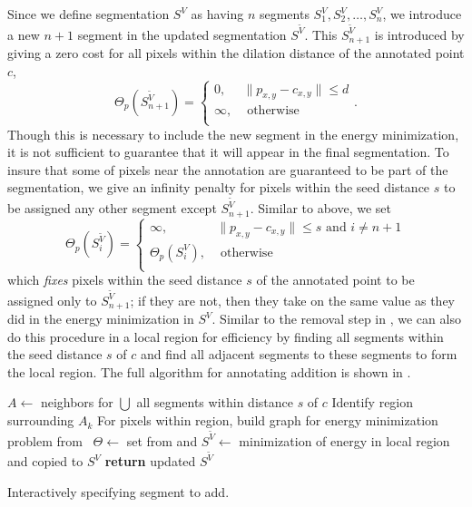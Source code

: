 \documentclass[]{spie}  %
\begin{document}
Since we define segmentation $S^V$ as having $n$ segments $S^V_1,
S^V_2, \ldots, S^V_n$, we introduce a new $n+1$ segment in the updated
segmentation $S^{\tilde{V}}$.  This $S^{\tilde{V}}_{n+1}$ is
introduced by giving a zero cost for all pixels within the dilation
distance of the annotated point $c$, \ie
\begin{equation}
  \label{eq:d}
  \Theta_p(S^{\tilde{V}}_{n+1}) = \left\{
    \begin{array}{lcr}
      0, & \| p_{x,y} - c_{x,y} \| \leq d  \\
      \infty, & \textrm{ otherwise} \\
    \end{array}
  \right. .
\end{equation}
Though this is necessary to include the new segment in the energy
minimization, it is not sufficient to guarantee that it will appear in
the final segmentation.  To insure that some of pixels near the
annotation are guaranteed to be part of the segmentation, we give an
infinity penalty for pixels within the seed distance $s$ to be
assigned any other segment except $S^{\tilde{V}}_{n+1}$.  Similar to
 above, we set
\begin{equation}
  \label{eq:s}
  \Theta_p(S^{\tilde{V}}_i) = \left\{
    \begin{array}{lcr}
      \infty, & \| p_{x,y} - c_{x,y} \| \leq s \textrm{ and } i \neq n+1  \\
      \Theta_p(S^{V}_i), & \textrm{ otherwise} \\
    \end{array}
  \right.
\end{equation}
which \emph{fixes} pixels within the seed distance $s$ of the
annotated point to be assigned only to $S^{\tilde{V}}_{n+1}$; if they
are not, then they take on the same value as they did in the energy
minimization in $S^V$.  Similar to the removal step in ,
we can also do this procedure in a local region for efficiency by
finding all segments within the seed distance $s$ of $c$ and find all
adjacent segments to these segments to form the local region.  The
full algorithm for annotating addition is shown in .
\begin{algorithm}[!t]
  \centering
  \algrenewcommand{}
  \begin{algorithmic}[1]
    \State $A \gets$ neighbors for $\bigcup$ all segments within distance $s$ of $c$
    \State Identify region surrounding $A_k$
    \State For pixels within region, build graph for energy minimization problem from~\cite{waggoner:11}
    \State $\Theta \gets $ set from  and 
    \State $ S^{\tilde{V}} \gets $ minimization of energy in local region and copied to $S^V$
    \State \textbf{return} updated $S^{\tilde{V}}$
    \EndFunction
  \end{algorithmic}
  \caption{Interactively specifying segment to add.}
  \label{alg:addition}
\end{algorithm}
\end{document}

